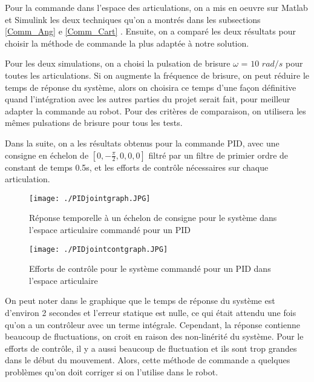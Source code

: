 
Pour la commande dans l'espace des articulations, on a mis en oeuvre sur Matlab et Simulink les deux techniques qu'on a montrés dans les subsections \ref{Comm_Ang} e \ref{Comm_Cart}%
. Ensuite, on a comparé les deux résultats pour choisir la méthode de commande la plus adaptée à notre solution.

Pour les deux simulations, on a choisi la pulsation de brisure $ \omega$ = $ 10$ $rad/s $ %
 pour toutes les articulations. Si on augmente la fréquence de brisure, on peut réduire le temps de réponse du système, alors on choisira ce temps d'une façon définitive quand l'intégration avec les autres parties du projet serait fait, pour meilleur adapter la commande au robot. Pour des critères de comparaison, on utilisera les mêmes pulsations de brisure pour tous les tests.

Dans la suite, on a les résultats obtenus pour la commande PID, avec une consigne en échelon de %
$ \left[0, -\frac{\pi}{2} , 0, 0, 0 \right] $ filtré par un filtre de primier ordre de constant de temps 0.5s, et les efforts de contrôle nécessaires sur chaque articulation.

\begin{figure}[H]
	\begin{center}	
		\texttt{[image: ./PIDjointgraph.JPG]}
		\caption{Réponse temporelle à un échelon de consigne pour le système dans l'espace articulaire commandé pour un PID}
		\label{fig:PID_joint_space_response}
	\end{center}
\end{figure}

\begin{figure}[H]
	\begin{center}	
		\texttt{[image: ./PIDjointcontgraph.JPG]}
		\caption{Efforts de contrôle pour le système commandé pour un PID dans l'espace articulaire }
		\label{fig:PIDjointcontgraph}
	\end{center}
\end{figure}

On peut noter dans le graphique que le temps de réponse du système est d'environ 2 secondes et l'erreur statique est nulle, ce qui était attendu une fois qu'on a un contrôleur avec un terme intégrale. Cependant, la réponse contienne beaucoup de fluctuations, on croit en raison des non-linérité du système. Pour le efforts de contrôle, il y a aussi beaucoup de fluctuation et ils sont trop grandes dans le début du mouvement.  Alors, cette méthode de commande a quelques problèmes qu'on doit corriger si on l'utilise dans le robot.

